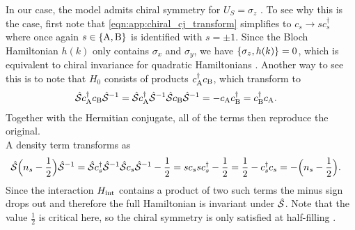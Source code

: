In our case, the model admits chiral symmetry for $U_S=\sigma_z$ \cite{EP_DynamicInduced_Quenched_Lehmann_2021}.
To see why this is the case, first note that \autoref{eqn:app:chiral_cj_transform} simplifies to $c_s \rightarrow sc_s^\dagger$ where once again $s\in\klc{\A,\B}$ is identified with $s=\pm 1$.
Since the Bloch Hamiltonian $h(k)$ only contains $\sigma_x$ and $\sigma_y$, we have $\klc{\sigma_z, h(k)} = 0$, which is equivalent to chiral invariance for quadratic Hamiltonians \cite[]{NHT_Classification_Chiu_2016}.
Another way to see this is to note that $H_0$ consists of products $c_\A^\dagger c_\B$, which transform to
\begin{align*}
\chs c_\A^\dagger c_\B \chs^{-1} &= \chs c_\A^\dagger \chs^{-1} \chs c_\B \chs^{-1} = - c_\A c_\B^\dagger = c_\B^\dagger c_\A.
\end{align*}
Together with the Hermitian conjugate, all of the terms then reproduce the original.\\
A density term transforms as
\begin{align*}
\chs \kla[\Big]{n_s - \frac{1}{2}} \chs^{-1} &= \chs c_s^\dagger \chs^{-1} \chs c_s \chs^{-1} - \frac{1}{2} = sc_s sc_s^\dagger - \frac{1}{2} = \frac{1}{2} - c_s^\dagger c_s = - \kla[\Big]{n_s - \frac{1}{2}}.
\end{align*}
Since the interaction $H_\tint$ contains a product of two such terms the minus sign drops out and therefore the full Hamiltonian is invariant under $\chs$.
Note that the value $\frac{1}{2}$ is critical here, so the chiral symmetry is only satisfied at half-filling \cite{EP_DynamicInduced_Quenched_Lehmann_2021}.
